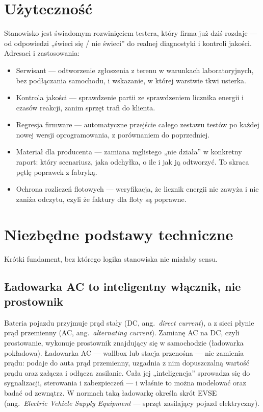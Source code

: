 \documentclass[11pt]{article}
\newcommand{\key}[1]{#1}
\begin{document}
\section{Użyteczność}

Stanowisko jest świadomym rozwinięciem testera, który firma już dziś rozdaje --- od odpowiedzi „świeci się / nie świeci” do realnej diagnostyki i kontroli jakości. Adresaci i zastosowania:

\begin{itemize}
  \item \key{Serwisant} --- odtworzenie zgłoszenia z terenu w warunkach laboratoryjnych, bez podłączania samochodu, i wskazanie, w której warstwie tkwi usterka.
  \item \key{Kontrola jakości} --- sprawdzenie partii ze sprawdzeniem licznika energii i czasów reakcji, zanim sprzęt trafi do klienta.
  \item \key{Regresja firmware} --- automatyczne przejście całego zestawu testów po każdej nowej wersji oprogramowania, z porównaniem do poprzedniej.
  \item \key{Materiał dla producenta} --- zamiana mglistego „nie działa” w konkretny raport: który scenariusz, jaka odchyłka, o ile i jak ją odtworzyć. To skraca pętlę poprawek z fabryką.
  \item \key{Ochrona rozliczeń flotowych} --- weryfikacja, że licznik energii nie zawyża i nie zaniża odczytu, czyli że faktury dla floty są poprawne.
\end{itemize}

\section{Niezbędne podstawy techniczne}

Krótki fundament, bez którego logika stanowiska nie miałaby sensu.

\subsection{Ładowarka AC to inteligentny włącznik, nie prostownik}

Bateria pojazdu przyjmuje prąd stały (DC, ang.\ \textit{direct current}), a z sieci płynie prąd przemienny (AC, ang.\ \textit{alternating current}). Zamianę AC na DC, czyli prostowanie, wykonuje prostownik znajdujący się \key{w samochodzie} (ładowarka pokładowa). Ładowarka AC --- wallbox lub stacja przenośna --- nie zamienia prądu: podaje do auta prąd przemienny, uzgadnia z nim dopuszczalną wartość prądu oraz załącza i odłącza zasilanie. Cała jej „inteligencja” sprowadza się do sygnalizacji, sterowania i zabezpieczeń --- i właśnie to można modelować oraz badać od zewnątrz. W normach taką ładowarkę określa skrót EVSE (ang.\ \textit{Electric Vehicle Supply Equipment} --- sprzęt zasilający pojazd elektryczny).
\end{document}
